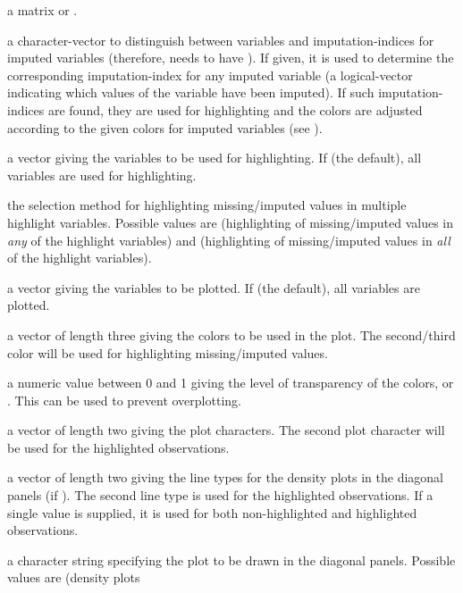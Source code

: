\begin{Arguments}
\begin{ldescription}
\item[\code{x}] a matrix or .
\item[\code{delimiter}] a character-vector to distinguish between variables
and imputation-indices for imputed variables (therefore,  needs
to have ). If given, it is used to determine the corresponding
imputation-index for any imputed variable (a logical-vector indicating
which values of the variable have been imputed). If such imputation-indices
are found, they are used for highlighting and the colors are adjusted 
according to the given colors for imputed variables (see ).
\item[\code{highlight}] a vector giving the variables to be used for 
highlighting.  If  (the default), all variables 
are used for highlighting.
\item[\code{selection}] the selection method for highlighting missing/imputed values in 
multiple highlight variables.  Possible values are  
(highlighting of missing/imputed values in \emph{any} of the highlight 
variables) and  (highlighting of missing/imputed values in 
\emph{all} of the highlight variables).
\item[\code{plotvars}] a vector giving the variables to be plotted.  If 
 (the default), all variables are plotted.
\item[\code{col}] a vector of length three giving the colors to be used in the plot.  
The second/third color will be used for highlighting missing/imputed values.
\item[\code{alpha}] a numeric value between 0 and 1 giving the level of 
transparency of the colors, or .  This can be used to
prevent overplotting.
\item[\code{pch}] a vector of length two giving the plot characters.  The second 
plot character will be used for the highlighted observations.
\item[\code{lty}] a vector of length two giving the line types for the density 
plots in the diagonal panels (if ).  The 
second line type is used for the highlighted observations.  If a 
single value is supplied, it is used for both non-highlighted 
and highlighted observations.
\item[\code{diagonal}] a character string specifying the plot to be drawn in the 
diagonal panels.  Possible values are  (density plots 

\end{ldescription}
\end{Arguments}
